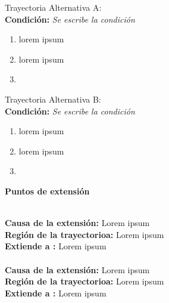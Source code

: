 \normalsize{Trayectoria Alternativa A:}\\\footnotesize{}
\textbf{Condición:} \textit{Se escribe la condición}

\begin{enumerate}[{A-}1.]
	\item \actor lorem ipsum
	\item \sistema lorem ipsum
	\item \finTA	

\end{enumerate}


\normalsize{Trayectoria Alternativa B:}\\
\footnotesize{} 
\textbf{Condición:} \textit{Se escribe la condición}

\begin{enumerate}[{B-}1.]
	\item \actor lorem ipsum
	\item \sistema lorem ipsum
	\item \finTA	

\end{enumerate}



\Large{\textbf{Puntos de extensión}}\\\\\footnotesize{}

\textbf{Causa de la extensión:} Lorem ipsum\\
\textbf{Región de la trayectorioa:} Lorem ipsum\\
\textbf{Extiende a :} Lorem ipsum\\\\

\textbf{Causa de la extensión:} Lorem ipsum\\
\textbf{Región de la trayectorioa:} Lorem ipsum\\
\textbf{Extiende a :} Lorem ipsum\\
